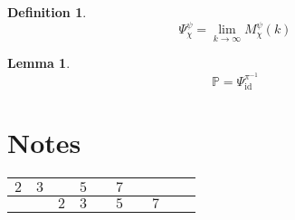 \documentclass{article}
\newcommand{\inv}{^{-1}}
\DeclareMathOperator{\id}{id}
\newtheorem{definition}{Definition}
\newtheorem{lemma}{Lemma}
\begin{document}
	\begin{definition}
		\begin{equation}
			Ψ_χ^ψ = \lim_{k→∞} M_χ^ψ(k)
		\end{equation}
	\end{definition}
	
	\begin{lemma}
		\begin{equation}
			\mathbb{P} = Ψ_{\id}^{π\inv}
		\end{equation}
	\end{lemma}
	
	\section{Notes}
	
	\begin{tabular}{|c|c|c|c|c|c|c|c|c|c|}
		\hline
		$2$ & $3$ & & $5$ & & $7$ & & & & \\
		\hline
		& & $2$ & $3$ & & $5$ & & $7$ & &  \\
		\hline
	\end{tabular}
\end{document}
